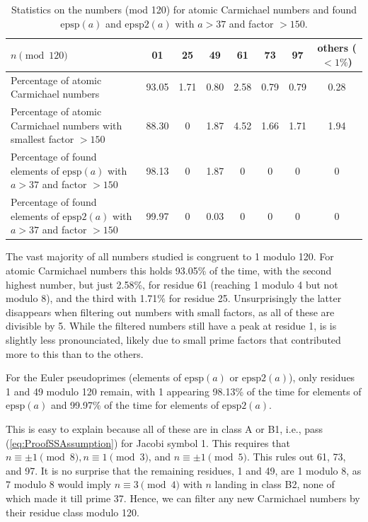 \documentclass[runningheads]{amsart}
\newcommand{\epsp}{\mathrm{epsp}}
\begin{document}
\begin{table}
\centering
\begin{tabular}{m{3cm}|c|c|c|c|c|c|c}
$n
\pmod{120}$
&
01
&
25
&
49
&61
&
73
&
97
&
others
($<1\%$)\\
\hline
Percentage of atomic Carmichael numbers
 &
93.05
&
1.71
&
0.80
&
2.58
&
0.79
&
0.79
&
0.28\\
        \hline
Percentage of atomic Carmichael numbers with smallest factor
$>150$
&
88.30
&
0
&
1.87
&
4.52
&
1.66
&
1.71
&
1.94\\
        \hline
Percentage of found elements of
$\epsp(a)$
with $a
>
37$ and factor
$>150$
&
98.13
&
0
&
1.87
&
0
&
0
&
0
&
0\\
          \hline
Percentage of found elements of
$\epsp2(a)$
with $a
>
37$ and factor
$>150$
&
99.97
&
0
&
0.03
&
0
&
0
&
0
&
0\\
\end{tabular}
\caption{Statistics on the numbers (mod 120) for atomic Carmichael numbers and found $\epsp(a)$ and $\epsp2(a)$ with $a > 37$ and factor $>150$.}
\label{tab:mod120_stats}
\end{table}

The vast majority of all numbers studied is congruent to 1 modulo 120.
For atomic Carmichael numbers this holds
93.05\%
of the time,
with the second highest number,
but just
2.58\%,
for residue 61 (reaching 1 modulo 4 but not modulo 8),
and the third with
1.71\%
for residue 25.
Unsurprisingly the latter disappears when filtering out numbers with small factors,
as all of these are divisible by 5.
While the filtered numbers still have a peak at residue 1,
is is slightly less pronounciated,
likely due to small prime factors that contributed more to this than to the others.

For the Euler pseudoprimes (elements of
$\epsp(a)$
or
$\epsp2(a)$),
only residues 1 and 49 modulo 120 remain,
with 1 appearing
98.13\%
of the time for elements of
$\epsp(a)$
and
99.97\%
of the time for elements of
$\epsp2(a)$.

This is easy to explain because all of these are in class A or B1,
i.e.,
pass
(\ref{eq:ProofSSAssumption})
for Jacobi symbol 1.
This requires that
$n\equiv
\pm
1
\pmod
8,
n
\equiv
1
\pmod
3$,
and $n
\equiv
\pm
1
\pmod
5$.
This rules out 61,
73,
and 97.
It is no surprise that the remaining residues,
1 and 49,
are 1 modulo 8,
as 7 modulo 8 would imply
$n\equiv
3
\pmod
4$ with $n$ landing in class B2,
none of which made it till prime 37.
Hence,
we can filter any new Carmichael numbers by their residue class modulo 120.
\end{document}
